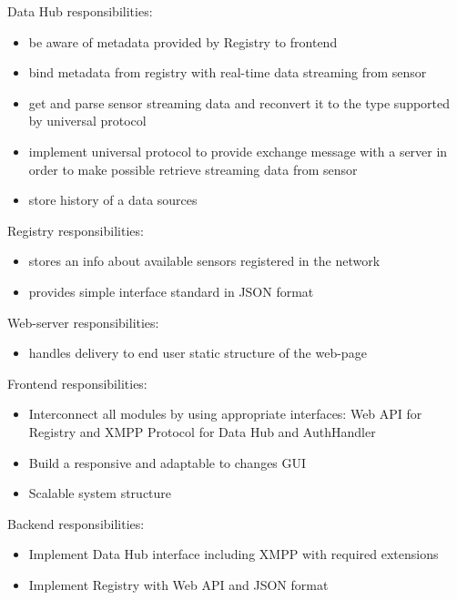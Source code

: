   Data Hub responsibilities:
  \begin{itemize}
    \item be aware of metadata provided by Registry to frontend
    \item bind metadata from registry with real-time data streaming from sensor
    \item get and parse sensor streaming data and reconvert it to the type supported by universal protocol
    \item implement universal protocol to provide exchange message with a server in order to make possible retrieve streaming data from sensor
    \item store history of a data sources
  \end{itemize}
  Registry responsibilities:
  \begin{itemize}
  \item stores an info about available sensors registered in the network
  \item provides simple interface standard in JSON format
  \end{itemize}
  Web-server responsibilities:
  \begin{itemize}
  \item handles delivery to end user static structure of the web-page
  \end{itemize}
  Frontend responsibilities:
  \begin{itemize}
  \item Interconnect all modules by using appropriate interfaces: Web API for Registry and XMPP Protocol for Data Hub and AuthHandler
  \item Build a responsive and adaptable to changes GUI
  \item Scalable system structure
  \end{itemize}
    Backend responsibilities:
  \begin{itemize}
  \item Implement Data Hub interface including XMPP with required extensions
  \item Implement Registry with Web API and JSON format
  \end{itemize}
